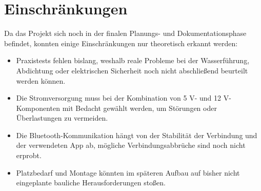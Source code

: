 \section{Einschränkungen}
Da das Projekt sich noch in der finalen Planungs- und Dokumentationsphase befindet, konnten einige Einschränkungen nur theoretisch erkannt werden:
\begin{itemize}
	\item Praxistests fehlen bislang, weshalb reale Probleme bei der Wasserführung, Abdichtung oder elektrischen Sicherheit noch nicht abschließend beurteilt werden können.
	\item Die Stromversorgung muss bei der Kombination von 5 V- und 12 V-Komponenten mit Bedacht gewählt werden, um Störungen oder Überlastungen zu vermeiden.
	\item Die Bluetooth-Kommunikation hängt von der Stabilität der Verbindung und der verwendeten App ab, mögliche Verbindungsabbrüche sind noch nicht erprobt.
	\item Platzbedarf und Montage könnten im späteren Aufbau auf bisher nicht eingeplante bauliche Herausforderungen stoßen.
\end{itemize}



